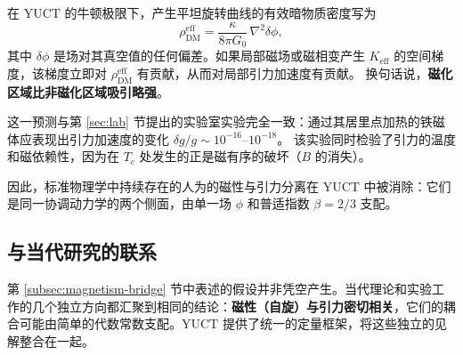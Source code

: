 \documentclass[12pt]{article}
\theoremstyle{remark}
\newcommand{\Keff}{K_{\mathrm{eff}}}
\begin{document}
	在 YUCT 的牛顿极限下，产生平坦旋转曲线的有效暗物质密度写为
	\begin{equation}
		\rho_{\mathrm{DM}}^{\mathrm{eff}} = \frac{\kappa}{8\pi G_0}\,\nabla^2\delta\phi,
		\label{eq:rho-dm}
	\end{equation}
	其中 $\delta\phi$ 是场对其真空值的任何偏差。如果局部磁场或磁相变产生 $\Keff$ 的空间梯度，该梯度立即对 $\rho_{\mathrm{DM}}^{\mathrm{eff}}$ 有贡献，从而对局部引力加速度有贡献。
	换句话说，\textbf{磁化区域比非磁化区域吸引略强}。
	
	这一预测与第 \ref{sec:lab} 节提出的实验室实验完全一致：通过其居里点加热的铁磁体应表现出引力加速度的变化 $\delta g/g \sim 10^{-16}$--$10^{-18}$。
	该实验同时检验了引力的温度和磁依赖性，因为在 $T_c$ 处发生的正是磁有序的破坏（$B$ 的消失）。
	
	因此，标准物理学中持续存在的人为的磁性与引力分离在 YUCT 中被消除：它们是同一协调动力学的两个侧面，由单一场 $\phi$ 和普适指数 $\beta = 2/3$ 支配。
	
	\subsection{与当代研究的联系}
	\label{subsec:mainstream}
	
	第 \ref{subsec:magnetism-bridge} 节中表述的假设并非凭空产生。当代理论和实验工作的几个独立方向都汇聚到相同的结论：\textbf{磁性（自旋）与引力密切相关}，它们的耦合可能由简单的代数常数支配。YUCT 提供了统一的定量框架，将这些独立的见解整合在一起。
	
\end{document}

